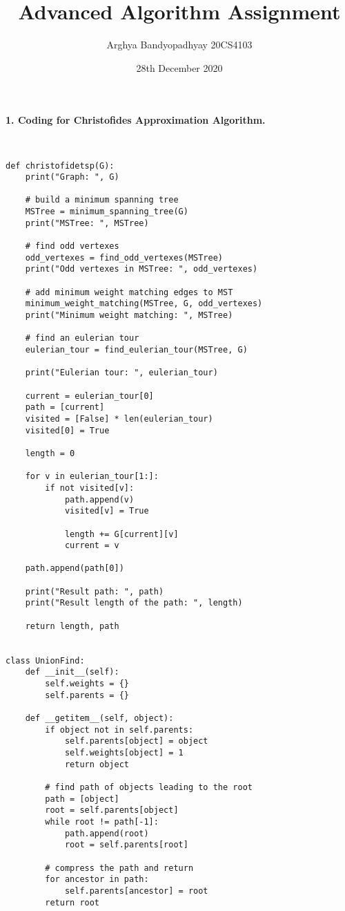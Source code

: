 \documentclass[12pt, letterpaper, twoside]{book}
\title{Advanced Algorithm Assignment}
\author{
Arghya Bandyopadhyay 20CS4103
}
\date{28th December 2020}
\begin{document}
\maketitle
\begin{large}
\textbf{1. Coding for Christofides Approximation Algorithm.}
\end{large}\\
\begin{lstlisting}
def christofidetsp(G):
    print("Graph: ", G)

    # build a minimum spanning tree
    MSTree = minimum_spanning_tree(G)
    print("MSTree: ", MSTree)

    # find odd vertexes
    odd_vertexes = find_odd_vertexes(MSTree)
    print("Odd vertexes in MSTree: ", odd_vertexes)

    # add minimum weight matching edges to MST
    minimum_weight_matching(MSTree, G, odd_vertexes)
    print("Minimum weight matching: ", MSTree)

    # find an eulerian tour
    eulerian_tour = find_eulerian_tour(MSTree, G)

    print("Eulerian tour: ", eulerian_tour)

    current = eulerian_tour[0]
    path = [current]
    visited = [False] * len(eulerian_tour)
    visited[0] = True

    length = 0

    for v in eulerian_tour[1:]:
        if not visited[v]:
            path.append(v)
            visited[v] = True

            length += G[current][v]
            current = v

    path.append(path[0])

    print("Result path: ", path)
    print("Result length of the path: ", length)

    return length, path


class UnionFind:
    def __init__(self):
        self.weights = {}
        self.parents = {}

    def __getitem__(self, object):
        if object not in self.parents:
            self.parents[object] = object
            self.weights[object] = 1
            return object

        # find path of objects leading to the root
        path = [object]
        root = self.parents[object]
        while root != path[-1]:
            path.append(root)
            root = self.parents[root]

        # compress the path and return
        for ancestor in path:
            self.parents[ancestor] = root
        return root


\end{lstlisting}
\end{document}
